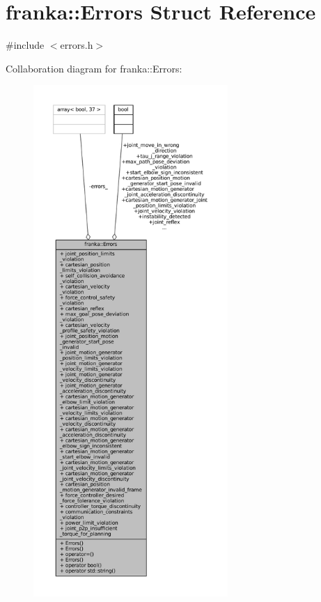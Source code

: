 \hypertarget{structfranka_1_1Errors}{}\section{franka\+:\+:Errors Struct Reference}
\label{structfranka_1_1Errors}


{\ttfamily \#include $<$errors.\+h$>$}



Collaboration diagram for franka\+:\+:Errors\+:
\nopagebreak
\begin{figure}[H]
\begin{center}
\leavevmode
\includegraphics[height=550pt]{structfranka_1_1Errors__coll__graph}
\end{center}
\end{figure}
